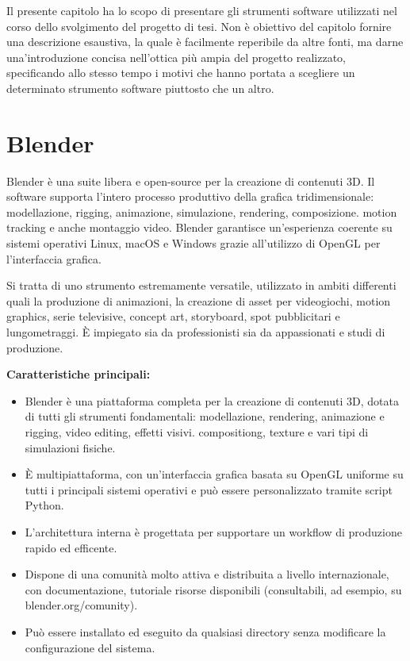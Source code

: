 Il presente capitolo ha lo scopo di presentare gli strumenti software utilizzati nel corso dello svolgimento del progetto di tesi. Non è obiettivo del capitolo fornire una descrizione esaustiva, la quale è facilmente reperibile da altre fonti, ma darne una'introduzione concisa nell'ottica più ampia del progetto realizzato, specificando allo stesso tempo i motivi che hanno portata a scegliere un determinato strumento software piuttosto che un altro. 
\section{Blender}
Blender è una suite libera e open-source per la creazione di contenuti 3D. Il software supporta l'intero processo produttivo della grafica tridimensionale: modellazione, rigging, animazione, simulazione, rendering, composizione. motion tracking e anche montaggio video.
Blender garantisce un'esperienza coerente su sistemi operativi Linux, macOS e Windows grazie all'utilizzo di OpenGL per l'interfaccia grafica.

Si tratta di uno strumento estremamente versatile, utilizzato in ambiti differenti quali la produzione di animazioni, la creazione di asset per videogiochi, motion graphics, serie televisive, concept art, storyboard, spot pubblicitari e lungometraggi. È impiegato sia da professionisti sia da appassionati e studi di produzione.


\textbf{Caratteristiche principali:}
\begin{itemize}
    \item Blender è una piattaforma completa per la creazione di contenuti 3D, dotata di tutti gli strumenti fondamentali: modellazione, rendering, animazione e rigging, video editing, effetti visivi. compositiong, texture e vari tipi di simulazioni fisiche.
    \item È multipiattaforma, con un'interfaccia grafica basata su OpenGL uniforme su tutti i principali sistemi operativi e può essere personalizzato tramite script Python.
    \item L'architettura interna è progettata per supportare un workflow di produzione rapido ed efficente.
    \item Dispone di una comunità molto attiva e distribuita a livello internazionale, con documentazione, tutoriale risorse disponibili (consultabili, ad esempio, su blender.org/comunity).
    \item Può essere installato ed eseguito da qualsiasi directory senza modificare la configurazione del sistema.
\end{itemize}

